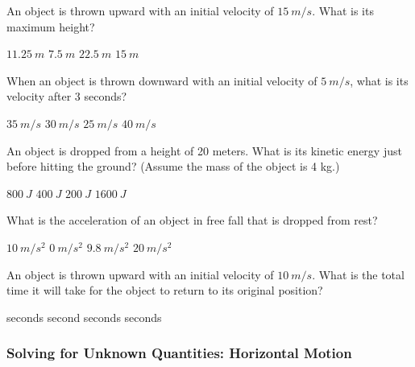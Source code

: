 \documentclass[]{exam}
\theoremstyle{definition}
\begin{document}
\begin{questions}
\question  
An object is thrown upward with an initial velocity of \(\SI{15}{m/s}\). What is its maximum height?  

\begin{randomizechoices}  
    \correctchoice \(\SI{11.25}{m}\)  
    \choice \(\SI{7.5}{m}\)  
    \choice \(\SI{22.5}{m}\)  
    \choice \(\SI{15}{m}\)  
\end{randomizechoices}  


\question  
When an object is thrown downward with an initial velocity of \(\SI{5}{m/s}\), what is its velocity after 3 seconds?  

\begin{randomizechoices}  
    \correctchoice \(\SI{35}{m/s}\)  
    \choice \(\SI{30}{m/s}\)  
    \choice \(\SI{25}{m/s}\)  
    \choice \(\SI{40}{m/s}\)  
\end{randomizechoices}  


\question  
An object is dropped from a height of 20 meters. What is its kinetic energy just before hitting the ground? (Assume the mass of the object is 4 kg.)  

\begin{randomizechoices}  
    \correctchoice \(\SI{800}{J}\)  
    \choice \(\SI{400}{J}\)  
    \choice \(\SI{200}{J}\)  
    \choice \(\SI{1600}{J}\)  
\end{randomizechoices}  


\question  
What is the acceleration of an object in free fall that is dropped from rest?  

\begin{randomizechoices}  
    \correctchoice \(\SI{10}{m/s^2}\)  
    \choice \(\SI{0}{m/s^2}\)  
    \choice \(\SI{9.8}{m/s^2}\)  
    \choice \(\SI{20}{m/s^2}\)  
\end{randomizechoices}  


\question  
An object is thrown upward with an initial velocity of \(\SI{10}{m/s}\). What is the total time it will take for the object to return to its original position?  

\begin{randomizechoices}  
     seconds  
     second  
     seconds  
     seconds  
\end{randomizechoices}  
\end{questions}

\clearpage

\subsubsection*{Solving for Unknown Quantities: Horizontal Motion}
\end{document}
